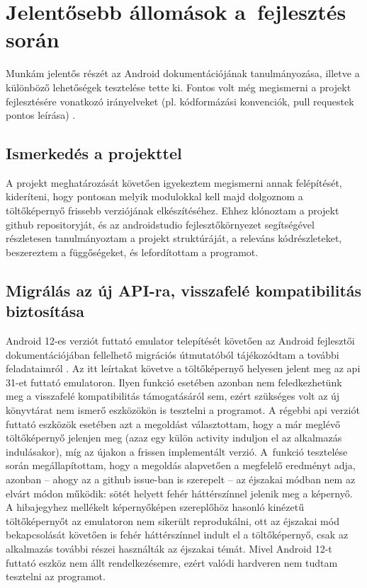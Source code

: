 \chapter{Jelentősebb állomások a~fejlesztés során}
Munkám jelentős részét az Android dokumentációjának tanulmányozása, illetve a különböző lehetőségek
tesztelése tette ki. Fontos volt még megismerni a projekt fejlesztésére vonatkozó irányelveket
(pl. kódformázási konvenciók, pull requestek pontos leírása) \cite{guidelines}.

\section{Ismerkedés a projekttel}
A projekt meghatározását követően igyekeztem megismerni annak felépítését, kideríteni, hogy
pontosan melyik modulokkal kell majd dolgoznom a töltőképernyő frissebb verziójának elkészítéséhez.
Ehhez klónoztam a projekt \gls{github} repositoryját, és az \gls{androidstudio} fejlesztőkörnyezet
segítségével részletesen tanulmányoztam a projekt struktúráját, a releváns kódrészleteket,
beszereztem a függőségeket, és lefordítottam a programot.

\section{Migrálás az új API-ra, visszafelé kompatibilitás biztosítása}
Android 12-es verziót futtató \gls{emulator} telepítését követően az Android fejlesztői
dokumentációjában fellelhető migrációs útmutatóból tájékozódtam a további feladataimról \cite{splashscreenmigration}.
Az itt leírtakat követve a töltőképernyő helyesen jelent meg az \acrshort{api} 31-et futtató \gls{emulator}on.
Ilyen funkció esetében azonban nem feledkezhetünk meg a visszafelé kompatibilitás támogatásáról
sem, ezért szükséges volt az új könyvtárat nem ismerő eszközökön is tesztelni a programot.
A régebbi \acrshort{api} verziót futtató eszközök esetében azt a megoldást választottam, hogy a már meglévő
töltőképernyő jelenjen meg (azaz egy külön  \gls{activity} induljon el az alkalmazás
indulásakor), míg az újakon a frissen implementált verzió. A~funkció tesztelése során
megállapítottam, hogy a megoldás alapvetően a megfelelő eredményt adja, azonban -- ahogy az a
\gls{github} issue-ban is szerepelt \cite{issue} -- az éjszakai módban nem az elvárt módon működik: sötét helyett
fehér háttérszínnel jelenik meg a képernyő. A hibajegyhez mellékelt képernyőképen szereplőhöz
hasonló kinézetű töltőképernyőt az \gls{emulator}on nem sikerült reprodukálni, ott az éjszakai mód
bekapcsolását követően is fehér háttérszínnel indult el a töltőképernyő, csak az alkalmazás
további részei használták az éjszakai témát. Mivel Android 12-t futtató eszköz nem állt
rendelkezésemre, ezért valódi hardveren nem tudtam tesztelni az programot.

